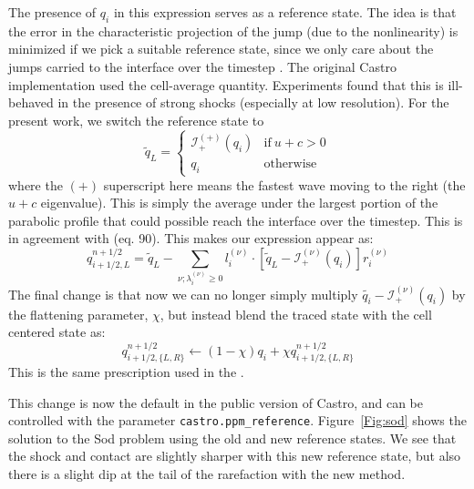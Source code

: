 \documentclass[12pt,preprint]{aastex}
\begin{document}
The presence of $q_i$ in this expression serves as a reference state.
The idea is that the error in the characteristic projection of the
jump (due to the nonlinearity) is minimized if we pick a suitable
reference state, since we only care about the jumps carried to the
interface over the timestep \citep{colellaglaz1985}.  The original
Castro implementation used the cell-average quantity.  Experiments
found that this is ill-behaved in the presence of strong shocks
(especially at low resolution). For the present work, we switch the
reference state to
\begin{equation}
\label{eq:refchoice}
\tilde{q}_L = \left \{ \begin{array}{cc}
       \mathcal{I}_+^{(+)}(q_i) & \mathrm{if~} u + c > 0 \\
       q_i                    & \mathrm{otherwise}
\end{array}
\right .
\end{equation}
where the $(+)$ superscript here means the fastest wave moving to the right
(the $u+c$ eigenvalue).   This is simply the average under the largest
portion of the parabolic profile that could possible reach the interface 
over the timestep.  This is
in agreement with \citet{ppmunsplit} (eq. 90).  This makes our
expression appear as:
\begin{equation}
\label{eq:ppmstatel}
q_{i+1/2,L}^{n+1/2} = \tilde{q}_L -
   \sum_{\nu;\lambda_i^{(\nu)}\ge 0} l_i^{(\nu)} \cdot \left [
        \tilde{q}_L  - \mathcal{I}^{(\nu)}_+(q_i)
       \right ] r_i^{(\nu)}
\end{equation}
The final change is that now we can no longer simply multiply
$\tilde{q_i} - \mathcal{I}^{(\nu)}_+(q_i)$ by the flattening
parameter, $\chi$, but instead blend the traced state with the cell
centered state as:
  \begin{equation}
  q_{i+1/2,\{L,R\}}^{n+1/2} \leftarrow (1 - \chi) q_i + \chi q_{i+1/2,\{L,R\}}^{n+1/2}
  \end{equation}
This is the same prescription used in the \cite{ppm}.

This change is now the default in the public version of Castro,
and can be controlled with the parameter {\tt castro.ppm\_reference}.
Figure~\ref{Fig:sod} shows the
solution to the Sod problem using the old and new reference states.
We see that the shock and contact are slightly sharper with this new
reference state, but also there is a slight dip at the tail of the
rarefaction with the new method.
\end{document}
